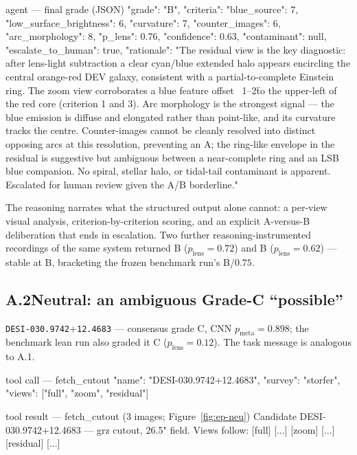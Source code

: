 \documentclass[11pt,letterpaper]{article}
\newcommand{\plens}{\ensuremath{p_{\mathrm{lens}}}}
\newcommand{\pmeta}{\ensuremath{p_{\mathrm{meta}}}}
\begin{document}
\begin{toolio}{agent --- final grade (JSON)}
{
  "grade": "B",
  "criteria": {"blue_source": 7, "low_surface_brightness": 6, "curvature": 7,
               "counter_images": 6, "arc_morphology": 8},
  "p_lens": 0.76,
  "confidence": 0.63,
  "contaminant": null,
  "escalate_to_human": true,
  "rationale": "The residual view is the key diagnostic: after lens-light subtraction a clear cyan/blue extended halo appears encircling the central orange-red DEV galaxy, consistent with a partial-to-complete Einstein ring. The zoom view corroborates a blue feature offset ~1–2\" to the upper-left of the red core (criterion 1 and 3). Arc morphology is the strongest signal — the blue emission is diffuse and elongated rather than point-like, and its curvature tracks the centre. Counter-images cannot be cleanly resolved into distinct opposing arcs at this resolution, preventing an A; the ring-like envelope in the residual is suggestive but ambiguous between a near-complete ring and an LSB blue companion. No spiral, stellar halo, or tidal-tail contaminant is apparent. Escalated for human review given the A/B borderline."
}
\end{toolio}

The reasoning narrates what the structured output alone cannot: a per-view visual
analysis, criterion-by-criterion scoring, and an explicit A-versus-B deliberation
that ends in escalation. Two further reasoning-instrumented recordings of the same
system returned B ($\plens=0.72$) and B ($\plens=0.62$) --- stable at B, bracketing
the frozen benchmark run's B/$0.75$.

\subsection*{A.2\quad Neutral: an ambiguous Grade-C ``possible''}
\texttt{DESI-030.9742$+$12.4683} --- consensus grade C, CNN $\pmeta=0.898$; the
benchmark lean run also graded it C ($\plens=0.12$). The task message is analogous
to A.1.

\begin{toolio}{tool call --- fetch\_cutout}
{"name": "DESI-030.9742+12.4683", "survey": "storfer", "views": ["full", "zoom", "residual"]}
\end{toolio}

\begin{toolio}{tool result --- fetch\_cutout (3 images; Figure~\ref{fig:ep-neu})}
Candidate DESI-030.9742+12.4683 — grz cutout, 26.5" field. Views follow:
[full] [...] [zoom] [...] [residual] [...]
\end{toolio}
\end{document}

